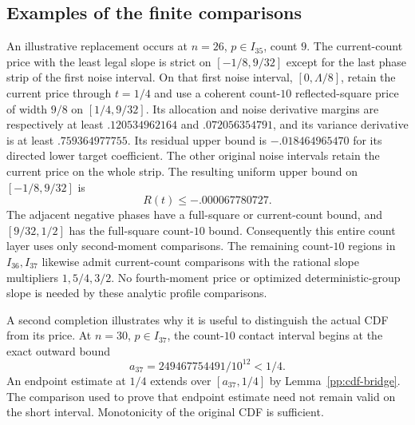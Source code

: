 \documentclass[aop,preprint]{imsart}
\theoremstyle{definition}
\numberwithin{equation}{section}
\begin{document}
\subsection{Examples of the finite comparisons}
An illustrative replacement occurs at $n=26$, $p\in I_{35}$,
count $9$. The current-count price with the least legal slope
is strict on $[-1/8,9/32]$ except for the last phase strip of
the first noise interval. On that first noise interval,
$[0,\Lambda/8]$, retain the current price through $t=1/4$ and
use a coherent count-$10$ reflected-square price of width $9/8$
on $[1/4,9/32]$. Its allocation and noise derivative margins
are respectively at least $.120534962164$ and $.072056354791$,
and its variance derivative is at least $.759364977755$.
Its residual upper bound is $-.018464965470$ for its directed
lower target coefficient. The other original noise intervals
retain the current price on the whole strip.
The resulting uniform upper bound on $[-1/8,9/32]$ is
\begin{equation}\label{fc:n26-simple}
 R(t)\le-.000067780727.
\end{equation}
The adjacent negative phases have a full-square or current-count
bound, and $[9/32,1/2]$ has the full-square count-$10$ bound.
Consequently this entire count layer uses only second-moment
comparisons. The remaining count-$10$ regions in $I_{36},I_{37}$
likewise admit current-count comparisons with the rational slope
multipliers $1,5/4,3/2$. No fourth-moment price or optimized
deterministic-group slope is needed by these analytic profile comparisons.

A second completion illustrates why it is useful to distinguish
the actual CDF from its price. At $n=30$, $p\in I_{37}$,
the count-$10$ contact interval begins at the exact outward
bound
\[
 a_{37}=249467754491/10^{12}<1/4.
\]
An endpoint estimate at $1/4$ extends over $[a_{37},1/4]$
by Lemma~\ref{pp:cdf-bridge}. The comparison used to prove that
endpoint estimate need not remain valid on the short interval.
Monotonicity of the original CDF is sufficient.
\end{document}
